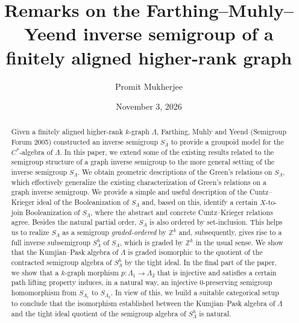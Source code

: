 \documentclass[a4paper,reqno,11pt]{amsart}
\numberwithin{equation}{section}
\theoremstyle{definition}
\theoremstyle{remark}
\begin{document}
\pagestyle{headings}


\title[Remarks on the Farthing--Muhly--Yeend inverse semigroup]{Remarks on the Farthing--Muhly--Yeend inverse semigroup of a finitely aligned higher-rank graph}

\author{Promit Mukherjee}
\address{Promit Mukherjee: Department of Mathematics, Jadavpur University, Kolkata-700032, India} 
\date{November 3, 2026}




\begin{abstract}
Given a finitely aligned higher-rank $k$-graph $\Lambda$, Farthing, Muhly and Yeend (Semigroup Forum 2005) constructed an inverse semigroup $S_\Lambda$ to provide a groupoid model for the $C^*$-algebra of $\Lambda$. In this paper, we extend some of the existing results related to the semigroup structure of a graph inverse semigroup to the more general setting of the inverse semigroup $S_\Lambda$. We obtain geometric descriptions of the Green's relations on $S_\Lambda$, which effectively generalize the existing characterization of Green's relations on a graph inverse semigroup. We provide a simple and useful description of the Cuntz--Krieger ideal of the Booleanization of $S_\Lambda$ and, based on this, identify a certain $X$-to-join Booleanization of $S_\Lambda$, where the abstract and concrete Cuntz--Krieger relations agree. Besides the natural partial order, $S_\Lambda$ is also ordered by set-inclusion. This helps us to realize $S_\Lambda$ as a semigroup \emph{graded-ordered} by $\mathbb{Z}^k$ and, subsequently, gives rise to a full inverse subsemigroup $S_\Lambda^h$ of $S_\Lambda$, which is graded by $\mathbb{Z}^k$ in the usual sense. We show that the Kumjian--Pask algebra of $\Lambda$ is graded isomorphic to the quotient of the contracted semigroup algebra of $S_\Lambda^h$ by the tight ideal. In the final part of the paper, we show that a $k$-graph morphism $p:\Lambda_1\longrightarrow \Lambda_2$ that is injective and satisfies a certain path lifting property induces, in a natural way, an injective $0$-preserving semigroup homomorphism from $S_{\Lambda_1}$ to $S_{\Lambda_2}$. In view of this, we build a suitable categorical setup to conclude that the isomorphism established between the Kumjian--Pask algebra of $\Lambda$ and the tight ideal quotient of the semigroup algebra of $S_\Lambda^h$ is natural. 
\end{abstract}
\end{document}
